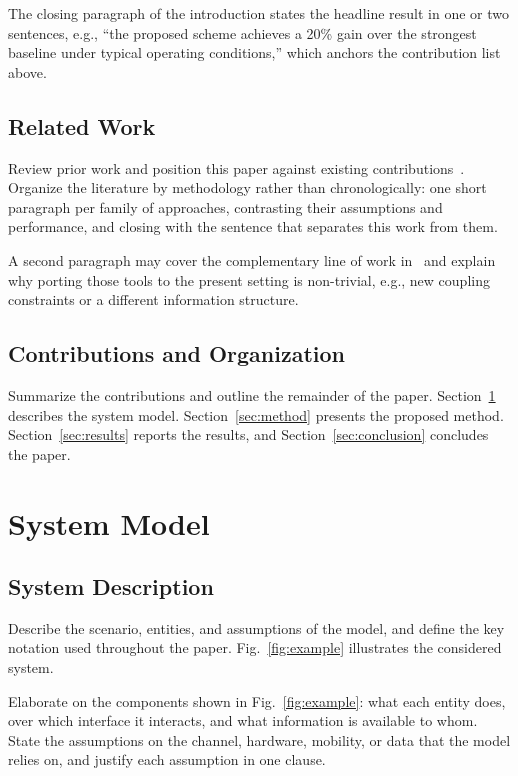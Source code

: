 \documentclass[conference]{IEEEtran}
\begin{document}
The closing paragraph of the introduction states the headline result in
one or two sentences, e.g., ``the proposed scheme achieves a 20\% gain
over the strongest baseline under typical operating conditions,'' which
anchors the contribution list above.

\subsection{Related Work}
Review prior work and position this paper against existing
contributions~\cite{ref_shannon1948, ref_boyd2004}. Organize the
literature by methodology rather than chronologically: one short paragraph
per family of approaches, contrasting their assumptions and performance,
and closing with the sentence that separates this work from them.

A second paragraph may cover the complementary line of work
in~\cite{ref_boyd2004} and explain why porting those tools to the present
setting is non-trivial, e.g., new coupling constraints or a different
information structure.

\subsection{Contributions and Organization}
Summarize the contributions and outline the remainder of the paper.
Section~\ref{sec:model} describes the system model.
Section~\ref{sec:method} presents the proposed method.
Section~\ref{sec:results} reports the results, and
Section~\ref{sec:conclusion} concludes the paper.

\section{System Model}\label{sec:model}

\subsection{System Description}
Describe the scenario, entities, and assumptions of the model, and define the
key notation used throughout the paper.
Fig.~\ref{fig:example} illustrates the considered system.

Elaborate on the components shown in Fig.~\ref{fig:example}: what each
entity does, over which interface it interacts, and what information is
available to whom. State the assumptions on the channel, hardware,
mobility, or data that the model relies on, and justify each assumption
in one clause.
\end{document}
